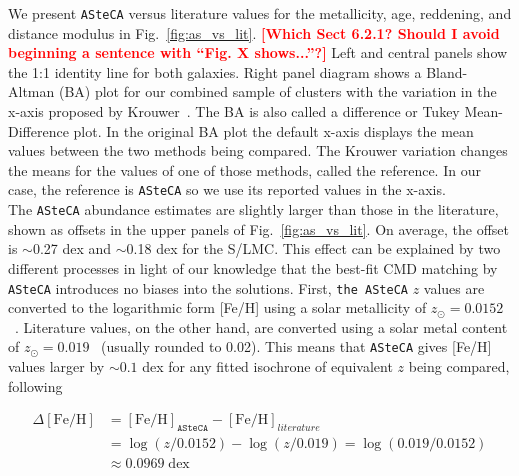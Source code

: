 \documentclass[draft]{aa}
\newcommand{\LEt}[1]{\textcolor{red}{\textbf{[#1]}}}
\begin{document}
We present \texttt{ASteCA} versus literature values for the metallicity, age,
reddening, and distance modulus in Fig.~\ref{fig:as_vs_lit}. \LEt{Which Sect
6.2.1? Should I avoid beginning a sentence with ``Fig. X shows...''?} Left and
central panels show the 1:1 identity line for both galaxies.
%
Right panel diagram shows a Bland-Altman (BA) plot for our combined sample
of clusters with the variation in the x-axis proposed by
Krouwer~\citep{Bland_1986,Krouwer_2008}. The BA is also called a
difference or Tukey Mean-Difference plot. In the original BA plot the
default x-axis displays the mean values between the two methods being compared.
The Krouwer variation changes the means for the values of one of those methods,
called the reference. In our case, the reference is \texttt{ASteCA}
so we use its reported values in the x-axis.\\
%

The \texttt{ASteCA} abundance estimates are slightly larger than those in
the literature, shown as offsets in the upper panels of Fig.~\ref{fig:as_vs_lit}.
On average, the offset is $\sim$0.27 dex and $\sim$0.18 dex for the S/LMC.\@
%
This effect can be explained by two different processes in light of our
knowledge that the best-fit CMD matching by  \texttt{ASteCA} introduces no
biases into the solutions.
%
First, \texttt{the ASteCA} $z$ values are converted to the logarithmic
form [Fe/H] using a solar metallicity of
$z_{\odot}{=}0.0152$~\citep{Bressan_2012}.
Literature values, on the other hand, are converted using a solar
metal content of $z_{\odot}{=}0.019$~\citep{Marigo_2008} (usually
rounded to 0.02). This means that \texttt{ASteCA} gives [Fe/H] values
larger by ${\sim}0.1$ dex for any fitted isochrone of equivalent $z$ being
compared, following

\begin{equation}
\begin{split}
\Delta\mathrm{[Fe/H]} & = \mathrm{[Fe/H]}_{\mathtt{ASteCA}} -
\mathrm{[Fe/H]}_{literature} \\
& = \log(z/0.0152) - \log(z/0.019) = \log(0.019/0.0152) \\
& \approx 0.0969 \;\mathrm{dex}
\end{split}
\label{eq:delta_feh}
\end{equation}
\end{document}
